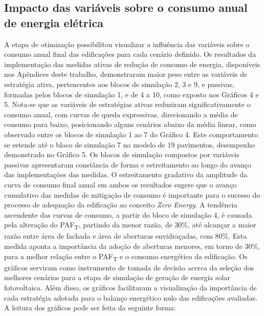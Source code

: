 \subsection{Impacto das variáveis sobre o consumo anual de energia elétrica}
\noindent A etapa de otimização possibilitou visualizar a influência das variáveis sobre o consumo anual final das edificações para cada cenário definido. Os resultados da implementação das medidas ativas de redução de consumo de energia, disponíveis nos Apêndices deste trabalho, demonstraram maior peso entre as variáveis de estratégia ativa, pertencentes aos blocos de simulação 2, 3 e 9, e passivas, formadas pelos blocos de simulação 1, e de 4 a 10, como exposto nos Gráficos 4 e 5.\vspace*{0.3cm} \newline
\noindent Nota-se que as variáveis de estratégias ativas reduziram significativamente o consumo anual, com curvas de queda expressivas, direcionando a média de consumo para baixo, posicionando alguns cenários abaixo da média linear, como observado entre os blocos de simulação 1 ao 7 do Gráfico 4. Este comportamento se estende até o bloco de simulação 7 no modelo de 19 pavimentos, desempenho demonstrado no Gráfico 5. Os blocos de simulação compostos por variáveis passivas apresentaram constância de forma e estreitamento ao longo do avanço das implementações das medidas. O estreitamento gradativo da amplitude da curva de consumo final anual em ambos os resultados sugere que o avanço cumulativo das medidas de mitigação de consumo é importante para o sucesso do processo de adequação da edificação ao conceito \textit{Zero Energy}.\vspace*{0.3cm} \newline
\noindent A tendência ascendente das curvas de consumo, a partir do bloco de simulação 4, é causada pela alteração do PAF\textsubscript{T}, partindo da menor razão, de 30\%, até alcançar a maior razão entre área de fachada e área de aberturas envidraçadas, com 80\%. Esta medida aponta a importância da adoção de aberturas menores, em torno de 30\%, para a melhor relação entre o PAF\textsubscript{T} e o consumo energético da edificação.\vspace*{0.3cm} \newline
\noindent Os gráficos serviram como instrumento de tomada de decisão acerca da seleção dos melhores cenários para a etapa de simulação de geração de energia solar fotovoltaica. Além disso, os gráficos facilitaram a visualização da importância de cada estratégia adotada para o balanço energético nulo das edificações avaliadas. A leitura dos gráficos pode ser feita da seguinte forma:
